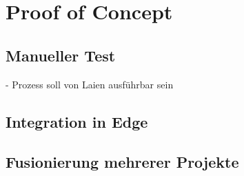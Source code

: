 \chapter{Proof of Concept}
\label{PoC}

	\section{Manueller Test}
	\label{Design:Struktur}
		- Prozess soll von Laien ausführbar sein
	
	\section{Integration in Edge}
	\label{Design:Abhängigkeiten}
	
	\section{Fusionierung mehrerer Projekte}
	\label{PoC:Fusionierung}